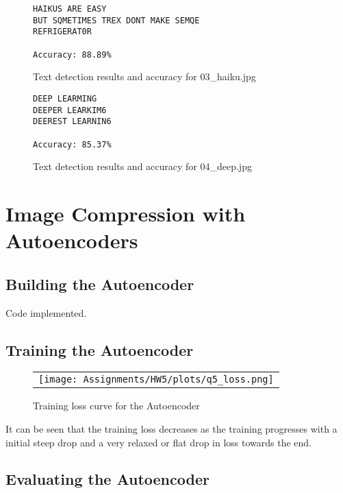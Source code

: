 \documentclass[a4paper]{article}
\begin{document}
\begin{figure}[!ht]
\centering
\begin{BVerbatim}
HAIKUS ARE EASY
BUT SQMETIMES TREX DONT MAKE SEMQE
REFRIGERAT0R

Accuracy: 88.89%
\end{BVerbatim}
\caption{Text detection results and accuracy for 03\_haiku.jpg}
\end{figure}

\begin{figure}[!ht]
\centering
\begin{BVerbatim}
DEEP LEARMING
DEEPER LEARKIM6
DEEREST LEARNIN6

Accuracy: 85.37%
\end{BVerbatim}
\caption{Text detection results and accuracy for 04\_deep.jpg}
\end{figure}

\section{Image Compression with Autoencoders}
\subsection{Building the Autoencoder}
Code implemented.

\subsection{Training the Autoencoder}
\begin{figure}[!ht]
\centering
\begin{tabular}{c}
{\texttt{[image: Assignments/HW5/plots/q5\_loss.png]}}
\end{tabular}
\caption{Training loss curve for the Autoencoder}
\end{figure}

It can be seen that the training loss decreases as the training progresses with a initial steep drop and a very relaxed or flat drop in loss towards the end.

\subsection{Evaluating the Autoencoder}
\end{document}
